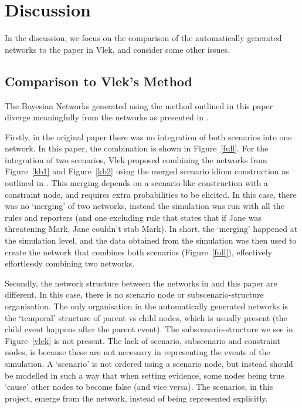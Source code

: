 \section{Discussion}
In the discussion, we focus on the comparison of the automatically generated networks to the paper in Vlek, and consider some other issues.


\subsection{Comparison to Vlek's Method}

The Bayesian Networks generated using the method outlined in this paper diverge meaningfully from the networks as presented in \citet{Vlek2015}. 

Firstly, in the original paper there was no integration of both scenarios into one network. In this paper, the combination is shown in Figure~\ref{full}. For the integration of two scenarios, Vlek proposed combining the networks from Figure~\ref{kb1} and Figure~\ref{kb2} using the merged scenario idiom construction as outlined in \citet{Vlek2014}. This merging depends on a scenario-like construction with a constraint node, and requires extra probabilities to be elicited. In this case, there was no `merging' of two networks, instead the simulation was run with all the rules and reporters (and one excluding rule that states that if Jane was threatening Mark, Jane couldn't stab Mark). In short, the `merging' happened at the simulation level, and the data obtained from the simulation was then used to create the network that combines both scenarios (Figure~\ref{full}), effectively effortlessly combining two networks.

Secondly, the network structure between the networks in \citet{Vlek2015} and this paper are different. In this case, there is no scenario node or subscenario-structure organisation. The only organisation in the automatically generated networks is the `temporal' structure of parent vs child nodes, which is usually present (the child event happens after the parent event). The subscenario-structure we see in Figure~\ref{vlek} is not present. The lack of scenario, subscenario and constraint nodes, is because these are not necessary in representing the events of the simulation. A `scenario' is not ordered using a scenario node, but instead should be modelled in such a way that when setting evidence, some nodes being true `cause' other nodes to become false (and vice versa). The scenarios, in this project, emerge from the network, instead of being represented explicitly.

